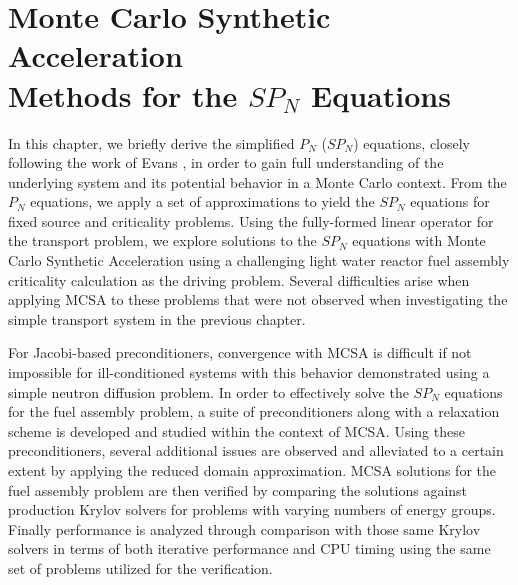 \chapter{Monte Carlo Synthetic Acceleration\\ Methods for the $SP_N$ Equations}
\label{ch:spn_equations}

In this chapter, we briefly derive the simplified $P_N$ ($SP_N$)
equations, closely following the work of Evans
\cite{evans_simplified_2013}, in order to gain full understanding of
the underlying system and its potential behavior in a Monte Carlo
context. From the $P_N$ equations, we apply a set of approximations to
yield the $SP_N$ equations for fixed source and criticality
problems. Using the fully-formed linear operator for the transport
problem, we explore solutions to the $SP_N$ equations with Monte Carlo
Synthetic Acceleration using a challenging light water reactor fuel
assembly criticality calculation as the driving problem. Several
difficulties arise when applying MCSA to these problems that were not
observed when investigating the simple transport system in the
previous chapter.

For Jacobi-based preconditioners, convergence with MCSA is difficult
if not impossible for ill-conditioned systems with this behavior
demonstrated using a simple neutron diffusion problem. In order to
effectively solve the $SP_N$ equations for the fuel assembly problem,
a suite of preconditioners along with a relaxation scheme is developed
and studied within the context of MCSA. Using these preconditioners,
several additional issues are observed and alleviated to a certain
extent by applying the reduced domain approximation. MCSA solutions
for the fuel assembly problem are then verified by comparing the
solutions against production Krylov solvers for problems with varying
numbers of energy groups. Finally performance is analyzed through
comparison with those same Krylov solvers in terms of both iterative
performance and CPU timing using the same set of problems utilized for
the verification.

